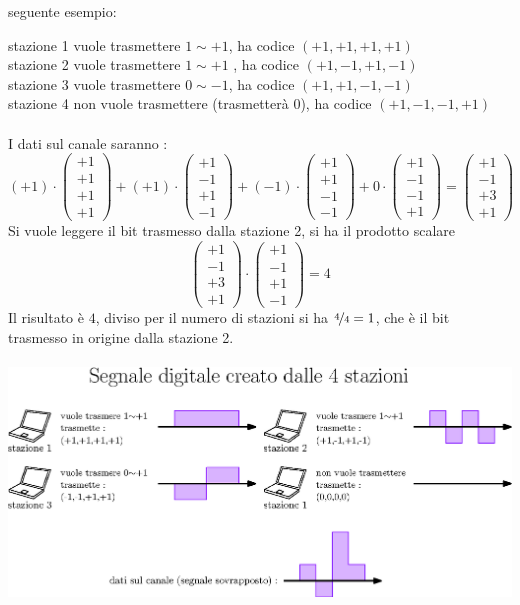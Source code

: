 \documentclass[12pt, letterpaper]{article}
\newcommand{\acc}{\\\hphantom{}\\}
\begin{document}
seguente esempio:\begin{center}
    stazione 1 vuole trasmettere $1 \sim +1$, ha codice $(+1,+1,+1,+1)$\\
    stazione 2 vuole trasmettere $1 \sim +1$ , ha codice $(+1,-1,+1,-1)$\\
    stazione 3 vuole trasmettere $0 \sim -1$, ha codice $(+1,+1,-1,-1)$\\
    stazione 4 non vuole trasmettere (trasmetterà $0$), ha codice $(+1,-1,-1,+1)$\acc 
    I dati sul canale saranno : $$ 
    (+1)\cdot \begin{pmatrix}
       +1\\+1\\+1\\+1
    \end{pmatrix}+(+1)\cdot \begin{pmatrix}
        +1\\-1\\+1\\-1
     \end{pmatrix}+(-1)\cdot \begin{pmatrix}
        +1\\+1\\-1\\-1
     \end{pmatrix}+0\cdot \begin{pmatrix}
        +1\\-1\\-1\\+1
     \end{pmatrix}=\begin{pmatrix}
        +1\\ -1 \\ +3 \\+1
     \end{pmatrix}
    $$
    Si vuole leggere il bit trasmesso dalla stazione 2, si ha il prodotto scalare $$ 
    \begin{pmatrix}
        +1\\ -1 \\ +3 \\+1
     \end{pmatrix}\cdot \begin{pmatrix}
        +1\\-1\\+1\\-1
     \end{pmatrix} = 4
    $$
    Il risultato è $4$, diviso per il numero di stazioni si ha $\nicefrac{4}{4}=1$, che è il bit 
    trasmesso in origine dalla stazione 2.\acc 
    \includegraphics[width=1\textwidth ]{images/CDMA2.eps}
\end{center}
\end{document}
